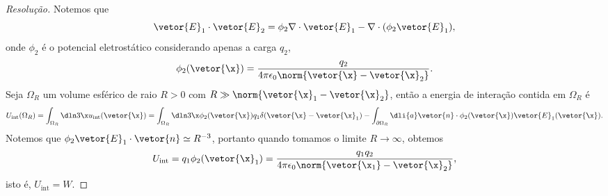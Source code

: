 \begin{proof}[Resolução]
    Notemos que
    \begin{equation*}
        \vetor{E}_1\cdot\vetor{E}_2 = \phi_2 \nabla \cdot \vetor{E}_1 - \nabla \cdot (\phi_2 \vetor{E}_1),
    \end{equation*}
    onde \(\phi_2\) é o potencial eletrostático considerando apenas a carga \(q_2\),
    \begin{equation*}
        \phi_2(\vetor{\x}) = \frac{q_2}{4\pi \epsilon_0 \norm{\vetor{\x} - \vetor{\x}_2}}.
    \end{equation*}
    Seja \(\Omega_R\) um volume esférico de raio \(R > 0\) com \(R \gg \norm{\vetor{\x}_1 - \vetor{\x}_2}\), então a energia de interação contida em \(\Omega_R\) é
    \begin{equation*}
        U_\mathrm{int}(\Omega_R) = \int_{\Omega_R} \dln3\x u_{\mathrm{int}}(\vetor{\x}) = \int_{\Omega_R}\dln3\x \phi_2(\vetor{\x}) q_1 \delta(\vetor{\x} - \vetor{\x}_1) - \int_{\partial \Omega_R} \dli{a} \vetor{n} \cdot \phi_2(\vetor{\x})\vetor{E}_1(\vetor{\x}).
    \end{equation*}
    Notemos que \(\phi_2 \vetor{E}_1\cdot\vetor{n}\simeq R^{-3}\), portanto quando tomamos o limite \(R \to \infty\), obtemos
    \begin{equation*}
        U_\mathrm{int} = q_1 \phi_2(\vetor{\x}_1) = \frac{q_1q_2}{4\pi \epsilon_0 \norm{\vetor{\x_1} - \vetor{\x}_2}},
    \end{equation*}
    isto é, \(U_\mathrm{int} = W\).
\end{proof}
